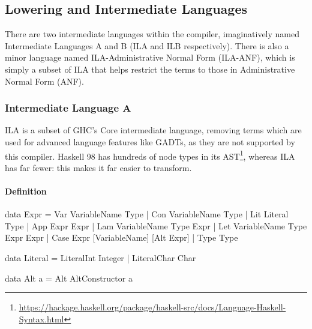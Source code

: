 \documentclass[dissertation.tex]{subfiles}
\begin{document}
{{{        }
    }
    \subsection{Lowering and Intermediate Languages}
    {

        There are two intermediate languages within the compiler, imaginatively named Intermediate Languages A and B
        (ILA and ILB respectively). There is also a minor language named ILA-Administrative Normal Form (ILA-ANF), which
        is simply a subset of ILA that helps restrict the terms to those in Administrative Normal Form (ANF).


        \subsubsection{Intermediate Language A}
        {

            ILA is a subset of GHC's Core intermediate language, removing terms which are used for advanced language
            features like GADTs, as they are not supported by this compiler. Haskell 98 has hundreds of node types in
            its
            AST\footnote{\url{https://hackage.haskell.org/package/haskell-src/docs/Language-Haskell-Syntax.html}}, whereas ILA has far fewer: this makes it far easier to transform.

            \paragraph*{Definition}
            {

                \begin{haskellfigure}
                data Expr = Var VariableName Type
                          | Con VariableName Type
                          | Lit Literal Type
                          | App Expr Expr
                          | Lam VariableName Type Expr
                          | Let VariableName Type Expr Expr
                          | Case Expr [VariableName] [Alt Expr]
                          | Type Type

                data Literal = LiteralInt Integer
                             | LiteralChar Char

                data Alt a = Alt AltConstructor a


\end{haskellfigure}}}}}
\end{document}
